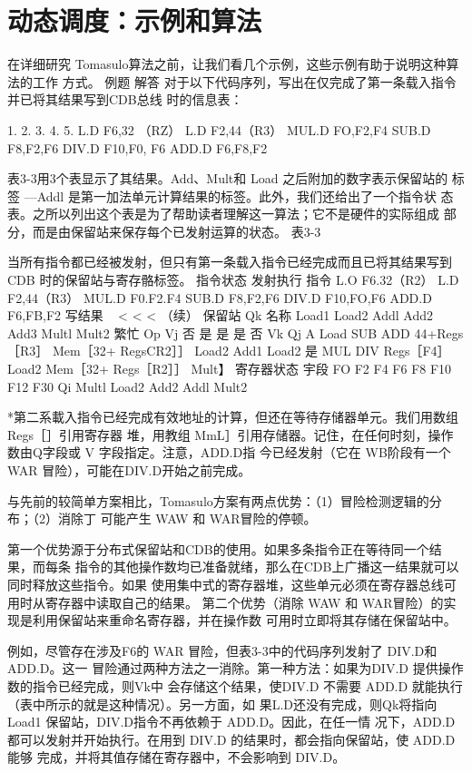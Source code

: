 \section{动态调度：示例和算法}
在详细研究 Tomasulo算法之前，让我们看几个示例，这些示例有助于说明这种算法的工作
方式。
例题
解答
对于以下代码序列，写出在仅完成了第一条载入指令并已将其结果写到CDB总线
时的信息表：

1.
2.
3.
4.
5.
L.D
F6,32 （RZ）
L.D
F2,44（R3）
MUL.D
FO,F2,F4
SUB.D
F8,F2,F6
DIV.D
F10,F0, F6
ADD.D
F6,F8,F2

表3-3用3个表显示了其结果。Add、Mult和 Load 之后附加的数字表示保留站的
标签
—Addl 是第一加法单元计算结果的标签。此外，我们还给出了一个指令状
态表。之所以列出这个表是为了帮助读者理解这一算法；它不是硬件的实际组成
部分，而是由保留站来保存每个已发射运算的状态。
表3-3

当所有指令都已经被发射，但只有第一条载入指令已经完成而且已将其结果写到
CDB 时的保留站与寄存骼标签。
指令状态
发射执行
指令
L.O
F6.32（R2）
L.D
F2,44（R3）
MUL.D
F0.F2.F4
SUB.D
F8,F2,F6
DIV.D F10,FO,F6
ADD.D F6,FB,F2
写结果
~
<
<
<
（续）
保留站
Qk
名称
Load1
Load2
Addl
Add2
Add3
Multl
Mult2
繁忙 Op
Vj
否
是
是
是
否
Vk
Qj
A
Load
SUB
ADD
44+Regs［R3］
Mem［32+ RegsCR2］］ Load2
Add1
Load2
是
MUL
DIV
Regs［F4］
Load2
Mem［32+ Regs［R2］］ Mult】
寄存器状态
宇段
FO
F2 F4 F6
F8
 F10
F12
F30
Qi
Multl
Load2
Add2 Addl
Mult2

*第二系載入指令已经完成有效地址的计算，但还在等待存储器单元。我们用数组 Regs［］引用寄存器
堆，用教组 MmL］引用存储器。记住，在任何时刻，操作数由Q字段或 V 字段指定。注意，ADD.D指
今已经发射（它在 WB阶段有一个WAR 冒险），可能在DIV.D开始之前完成。

与先前的较简单方案相比，Tomasulo方案有两点优势：（1）冒险检测逻辑的分布；（2）消除丁
可能产生 WAW 和 WAR冒险的停顿。

第一个优势源于分布式保留站和CDB的使用。如果多条指令正在等待同一个结果，而每条
指令的其他操作数均已准备就绪，那么在CDB上广播这一结果就可以同时释放这些指令。如果
使用集中式的寄存器堆，这些单元必须在寄存器总线可用时从寄存器中读取自己的结果。
第二个优势（消除 WAW 和 WAR冒险）的实现是利用保留站来重命名寄存器，并在操作数
可用时立即将其存储在保留站中。

例如，尽管存在涉及F6的 WAR 冒险，但表3-3中的代码序列发射了 DIV.D和 ADD.D。这一
冒险通过两种方法之一消除。第一种方法：如果为DIV.D 提供操作数的指令已经完成，则Vk中
会存储这个结果，使DIV.D 不需要 ADD.D 就能执行（表中所示的就是这种情况）。另一方面，如
果L.D还没有完成，则Qk将指向Load1 保留站，DIV.D指令不再依赖于 ADD.D。因此，在任一情
况下，ADD.D 都可以发射并开始执行。在用到 DIV.D 的结果时，都会指向保留站，使 ADD.D 能够
完成，并将其值存储在寄存器中，不会影响到 DIV.D。

